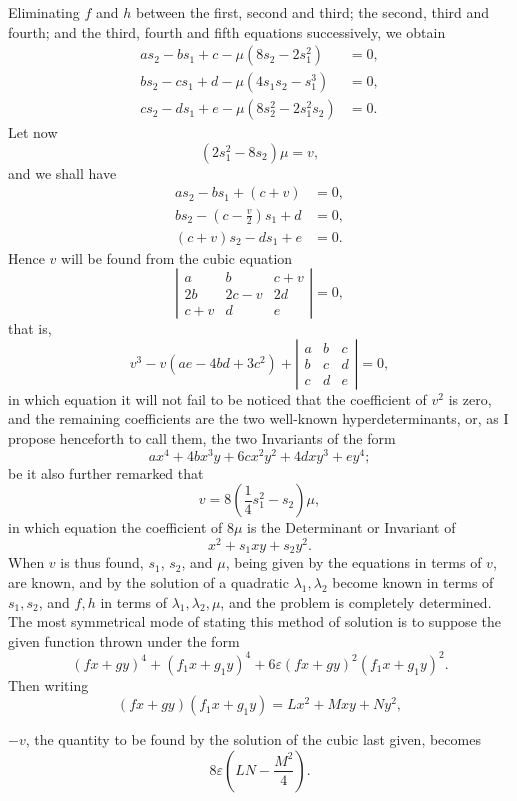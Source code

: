 \documentclass[11pt]{article}
\newcommand{\sourcepage}[1]{\marginpar{\scriptsize p.~#1}}
\begin{document}
{{\sourcepage{270}
Eliminating $f$ and $h$ between the first, second and third; the second, third and fourth; and the third, fourth and fifth equations successively, we obtain
\[
\begin{aligned}
as_2-bs_1+c-\mu(8s_2-2s_1^2)&=0,\\
bs_2-cs_1+d-\mu(4s_1s_2-s_1^3)&=0,\\
cs_2-ds_1+e-\mu(8s_2^2-2s_1^2s_2)&=0.
\end{aligned}
\]
Let now
\[
(2s_1^2-8s_2)\mu=v,
\]
and we shall have
\[
\begin{aligned}
as_2-bs_1+(c+v)&=0,\\
bs_2-\left(c-\frac{v}{2}\right)s_1+d&=0,\\
(c+v)s_2-ds_1+e&=0.
\end{aligned}
\]
Hence $v$ will be found from the cubic equation
\[
\left|\begin{array}{ccc}
a&b&c+v\\
2b&2c-v&2d\\
c+v&d&e
\end{array}\right|=0,
\]
that is,
\[
v^3-v(ae-4bd+3c^2)+
\left|\begin{array}{ccc}
a&b&c\\
b&c&d\\
c&d&e
\end{array}\right|=0,
\]
in which equation it will not fail to be noticed that the coefficient of $v^2$ is zero, and the remaining coefficients are the two well-known hyperdeterminants, or, as I propose henceforth to call them, the two Invariants of the form
\[
ax^4+4bx^3y+6cx^2y^2+4dxy^3+ey^4;
\]
be it also further remarked that
\[
v=8\left(\frac14s_1^2-s_2\right)\mu,
\]
in which equation the coefficient of $8\mu$ is the Determinant or Invariant of
\[
x^2+s_1xy+s_2y^2.
\]
When $v$ is thus found, $s_1$, $s_2$, and $\mu$, being given by the equations in terms of $v$, are known, and by the solution of a quadratic $\lambda_1,\lambda_2$ become known in terms of $s_1,s_2$, and $f,h$ in terms of $\lambda_1,\lambda_2,\mu$, and the problem is completely determined. The most symmetrical mode of stating this method of solution is to suppose the given function thrown under the form
\[
(fx+gy)^4+(f_1x+g_1y)^4+6\varepsilon(fx+gy)^2(f_1x+g_1y)^2.
\]
Then writing
\[
(fx+gy)(f_1x+g_1y)=Lx^2+Mxy+Ny^2,
\]

\sourcepage{271}
$-v$, the quantity to be found by the solution of the cubic last given, becomes
\[
8\varepsilon\left(LN-\frac{M^2}{4}\right).
\]

}}
\end{document}
